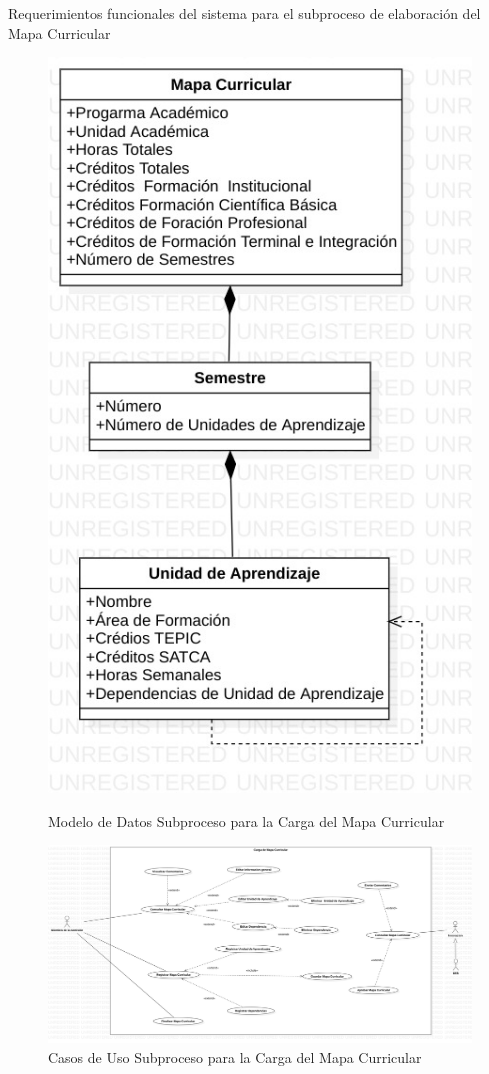 \begin{table}[htbp!]
\begin{requerimientos}
        \label{RM12}

        \label{RM13}


    \end{requerimientos}
    \caption{Requerimientos funcionales del sistema para el subproceso de elaboración del Mapa Curricular}
    \label{tbl:RFUA}
\end{table}

\begin{figure}[htbp]
    \begin{center}
        \includegraphics[width=.50\textwidth]{C2-DR/SP4/Image/ModeloDeDatosMC}
        \label{MD-SP4}
        \caption{Modelo de Datos Subproceso para la  Carga del Mapa Curricular}
    \end{center}
\end{figure}

\begin{figure}[htbp]
	\begin{center}
		\includegraphics[width=.95\textwidth]{C2-DR/SP4/Image/CasosDeUso}
		\caption{Casos de Uso Subproceso para la  Carga del Mapa Curricular}
		\label{CU-SP4}
	\end{center}
\end{figure}


